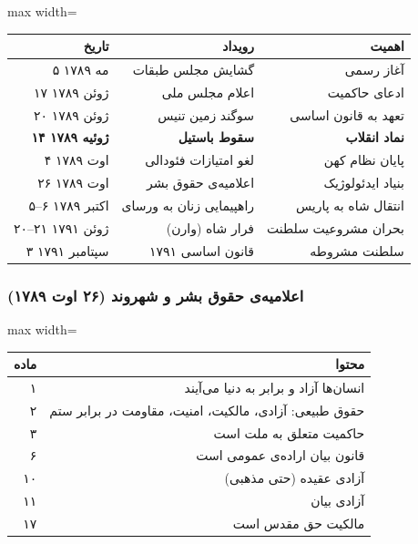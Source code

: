 \begin{center}
\begin{adjustbox}{max width=\linewidth}%
\begin{tabular}{rrr}
\toprule
\rowcolor{PhaseLiberal}
\color{white}\bfseries تاریخ & \color{white}\bfseries رویداد
  & \color{white}\bfseries اهمیت \\
\midrule
\rowcolor{BgCool} ۵ مه ۱۷۸۹ & گشایش مجلس طبقات & آغاز رسمی \\
\rowcolor{BgWarm} ۱۷ ژوئن ۱۷۸۹ & اعلام مجلس ملی & ادعای حاکمیت \\
\rowcolor{BgCool} ۲۰ ژوئن ۱۷۸۹ & سوگند زمین تنیس & تعهد به قانون اساسی \\
\rowcolor{AccentGold!20} \bfseries ۱۴ ژوئیه ۱۷۸۹ & \bfseries سقوط باستیل
  & \bfseries نماد انقلاب \\
\rowcolor{BgCool} ۴ اوت ۱۷۸۹ & لغو امتیازات فئودالی & پایان نظام کهن \\
\rowcolor{BgWarm} ۲۶ اوت ۱۷۸۹ & اعلامیه‌ی حقوق بشر & بنیاد ایدئولوژیک \\
\rowcolor{BgCool} ۵–۶ اکتبر ۱۷۸۹ & راهپیمایی زنان به ورسای
  & انتقال شاه به پاریس \\
\rowcolor{BgWarm} ۲۰–۲۱ ژوئن ۱۷۹۱ & فرار شاه (وارن)
  & بحران مشروعیت سلطنت \\
\rowcolor{BgCool} ۳ سپتامبر ۱۷۹۱ & قانون اساسی ۱۷۹۱ & سلطنت مشروطه \\
\bottomrule
\end{tabular}
\end{adjustbox}
\end{center}

\subsubsection{اعلامیه‌ی حقوق بشر و شهروند (۲۶ اوت ۱۷۸۹)}

\begin{tcolorbox}[mybox, title={\rl{اصول کلیدی اعلامیه‌ی حقوق بشر}}]
\begin{center}
\begin{adjustbox}{max width=\linewidth}%
\begin{tabular}{rr}
\toprule
\rowcolor{AccentGold!30}
\bfseries ماده & \bfseries محتوا \\
\midrule
\rowcolor{BgWarm} ۱ & انسان‌ها آزاد و برابر به دنیا می‌آیند \\
\rowcolor{BgCool} ۲ & حقوق طبیعی: آزادی، مالکیت، امنیت، مقاومت در برابر ستم \\
\rowcolor{BgWarm} ۳ & حاکمیت متعلق به ملت است \\
\rowcolor{BgCool} ۶ & قانون بیان اراده‌ی عمومی است \\
\rowcolor{BgWarm} ۱۰ & آزادی عقیده (حتی مذهبی) \\
\rowcolor{BgCool} ۱۱ & آزادی بیان \\
\rowcolor{BgWarm} ۱۷ & مالکیت حق مقدس است \\
\bottomrule
\end{tabular}
\end{adjustbox}
\end{center}
\end{tcolorbox}

